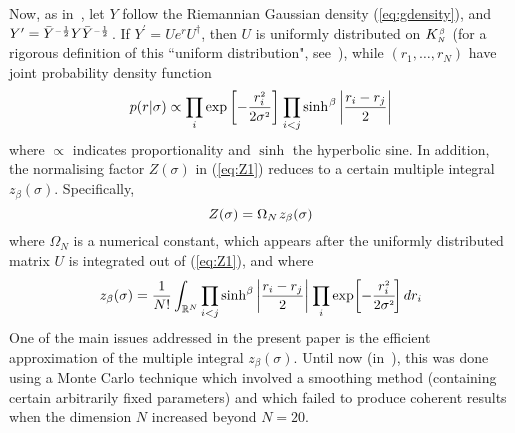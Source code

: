 \documentclass[draftclsnofoot]{IEEEtran}
\begin{document}
Now, as in~\cite{Sa17}, let $Y$ follow the Riemannian Gaussian density (\ref{eq:gdensity}), and $Y^\prime = \bar{Y}^{\scriptscriptstyle -\frac{1}{2}}Y\bar{Y}^{\scriptscriptstyle -\frac{1}{2}}\hspace{0.03cm}$.
If $Y^\prime = U e^r U^\dagger$, then $U$ is uniformly distributed on $K^{\hspace{0.02cm}\scriptscriptstyle \beta}_{\scriptscriptstyle N\hspace{0.02cm}}$ (for a rigorous definition of this ``uniform distribution", see~\cite{meckes}), while $(r_{\scriptscriptstyle 1},\ldots,r_{\scriptscriptstyle N})$ have joint probability density function
\begin{equation} \label{eq:rjointpdf}
 p(r|\sigma) \propto \prod_{i} \exp\left[-\frac{r^{\scriptscriptstyle 2}_i}{2\sigma^{\scriptscriptstyle 2}}\right]\hspace{0.03cm}
 \prod_{i<j} \sinh^{\hspace{0.02cm}\beta}\left|\frac{r_i-r_j}{2}\right|
\end{equation}
where $\propto$ indicates proportionality and $\sinh$ the hyperbolic sine. In addition, the normalising factor $Z(\sigma)$ in (\ref{eq:Z1}) reduces to a certain multiple integral $z_\beta(\sigma)$. Specifically,
\begin{equation} \label{eq:Z2}
 Z(\sigma) = \Omega_N \hspace{0.03cm} z_\beta(\sigma)
\end{equation}
where $\Omega_N$ is a numerical constant, which appears after the 
uniformly distributed matrix $U$ is integrated out of (\ref{eq:Z1}), and where
\begin{equation} \label{eq:z1}
 z_\beta(\sigma) = \frac{1}{N!}\int_{\mathbb{R}^N}
 \prod_{i<j} \sinh^{\beta}\left|\frac{r_i-r_j}{2}\right|\hspace{0.02cm}\prod_{i} \exp\!\left[-\frac{r^{\scriptscriptstyle 2}_i}{2\sigma^{\scriptscriptstyle 2}}\!\right] dr_i
\end{equation}
One of the main issues addressed in the present paper is the efficient approximation of the multiple integral $z_\beta(\sigma)$. Until now (in~\cite{Sa16}\cite{Sa17}), this was done using a Monte Carlo technique which involved a smoothing method (containing certain arbitrarily fixed parameters) and which failed to produce coherent results when the dimension $N$ increased beyond $N = 20$. %
\end{document}

